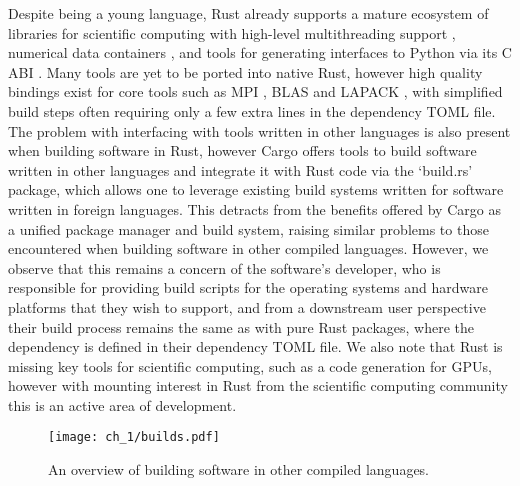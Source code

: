 Despite being a young language, Rust already supports a mature ecosystem of libraries for scientific computing with high-level multithreading support \cite{rayon2018github}, numerical data containers \cite{ndarray2022github}, and tools for generating interfaces to Python via its C ABI \cite{maturin2022github}. Many tools are yet to be ported into native Rust, however high quality bindings exist for core tools such as MPI \cite{rsmpi2018github}, BLAS and LAPACK \cite{blaslapackrust2022github}, with simplified build steps often requiring only a few extra lines in the dependency TOML file. The problem with interfacing with tools written in other languages is also present when building software in Rust, however Cargo offers tools to build software written in other languages and integrate it with Rust code via the `build.rs' package, which allows one to leverage existing build systems written for software written in foreign languages. This detracts from the benefits offered by Cargo as a unified package manager and build system, raising similar problems to those encountered when building software in other compiled languages. However, we observe that this remains a concern of the software's developer, who is responsible for providing build scripts for the operating systems and hardware platforms that they wish to support, and from a downstream user perspective their build process remains the same as with pure Rust packages, where the dependency is defined in their dependency TOML file. We also note that Rust is missing key tools for scientific computing, such as a code generation for GPUs, however with mounting interest in Rust from the scientific computing community this is an active area of development.


\begin{figure}
    \centerline{\texttt{[image: ch\_1/builds.pdf]}}
    \caption{An overview of building software in other compiled languages.}
    \label{fig:chpt:1:sec:2:builds}
\end{figure}
